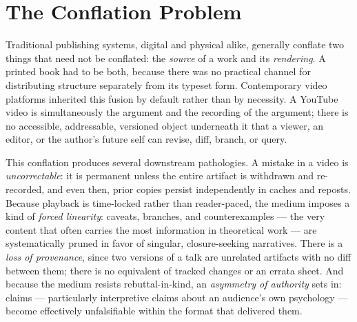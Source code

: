\documentclass[11pt]{article}
\theoremstyle{definition}
\begin{document}
\begin{abstract}
This revision extends the essay in five further directions: it argues that artificial ingestion limits are a misplaced choke point relative to the genuine costs of preservation, availability, and physical realization; it gives citation a full computational content --- an executable citation as a typed, verifiable derivation rather than a pointer --- and uses it to make the substrate's own audit machinery concrete rather than aspirational; it strengthens two previously acknowledged but underdeveloped failure modes (provenance overload, renderer concentration) using that same machinery; and it closes by situating the proposal against a companion operating-system specification, Spherepop OS, showing the two documents' independently-derived formalisms converge strongly while surfacing at least one genuine correction each document owes itself. It closes by proposing a public, competitive practice --- a form of \emph{pipeline golf} --- in which participants compete to produce the most interesting, entertaining, or explanatorily faithful transformations of a fixed text into image, animation, or sound.
\end{abstract}

\newpage

\section{The Conflation Problem}
\label{sec:conflation}

Traditional publishing systems, digital and physical alike, generally conflate two things that need not be conflated: the \emph{source} of a work and its \emph{rendering}. A printed book had to be both, because there was no practical channel for distributing structure separately from its typeset form. Contemporary video platforms inherited this fusion by default rather than by necessity. A YouTube video is simultaneously the argument and the recording of the argument; there is no accessible, addressable, versioned object underneath it that a viewer, an editor, or the author's future self can revise, diff, branch, or query.

This conflation produces several downstream pathologies. A mistake in a video is \emph{uncorrectable}: it is permanent unless the entire artifact is withdrawn and re-recorded, and even then, prior copies persist independently in caches and reposts. Because playback is time-locked rather than reader-paced, the medium imposes a kind of \emph{forced linearity}: caveats, branches, and counterexamples --- the very content that often carries the most information in theoretical work --- are systematically pruned in favor of singular, closure-seeking narratives. There is a \emph{loss of provenance}, since two versions of a talk are unrelated artifacts with no diff between them; there is no equivalent of tracked changes or an errata sheet. And because the medium resists rebuttal-in-kind, an \emph{asymmetry of authority} sets in: claims --- particularly interpretive claims about an audience's own psychology --- become effectively unfalsifiable within the format that delivered them.
\end{document}
